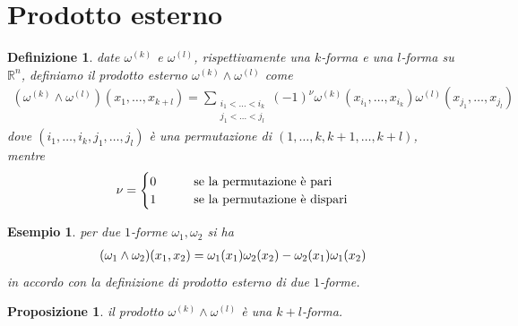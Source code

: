 \documentclass[oneside, 11pt]{amsbook}
\newcommand{\0}{{(0)}}
\newcommand{\3}{{(3)}}
\theoremstyle{colonplain}
\newtheorem{prop}[thm]{Proposizione}
\theoremstyle{colondefinition}
\newtheorem{defn}[thm]{Definizione}
\newtheorem{ex}[thm]{Esempio}
\theoremstyle{colonremark}
\numberwithin{equation}{chapter}
\begin{document}
\section{Prodotto esterno}
\begin{defn} date $\omega^{(k)}$ e $\omega^{(l)}$, rispettivamente una $k$-forma e una $l$-forma su $\mathbb{R}^n$, definiamo il prodotto esterno $\omega^{(k)} \wedge \omega^{(l)}$ come
\begin{align}\label{ExtProdDefn}
    (\omega^{(k)} \wedge \omega^{(l)})(x_1, \dots, x_{k + l}) = \sum_{\substack{i_1 < \dots < i_k \\ j_1 < \dots < j_l}}(-1)^\nu \omega^{(k)}(x_{i_1}, \dots, x_{i_k})\omega^{(l)}(x_{j_1}, \dots, x_{j_l}) 
\end{align}
dove $(i_1, \dots, i_k, j_1, \dots, j_l)$ è una permutazione di $(1, \dots, k, k + 1, \dots, k + l)$, mentre 
\begin{align}
    \nu = \begin{cases}
        0 \qquad &\text{se la permutazione è pari} \\
        1 \qquad &\text{se la permutazione è dispari}
    \end{cases} \notag
\end{align}
\end{defn}
\begin{ex} per due $1$-forme $\omega_1, \omega_2$ si ha 
\begin{align}
    (\omega_1 \wedge \omega_2)(x_1, x_2) = \omega_1(x_1)\omega_2(x_2) - \omega_2(x_1)\omega_1(x_2) \notag
\end{align}
in accordo con la definizione di prodotto esterno di due $1$-forme.
\end{ex}
\begin{prop} il prodotto $\omega^{(k)} \wedge \omega^{(l)}$ è una $k + l$-forma.
\end{prop}
\end{document}
